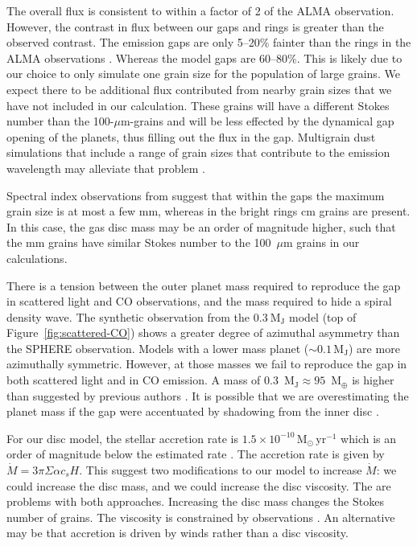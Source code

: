 \documentclass[usenatbib,a4paper,times]{mnras}
\renewcommand{\sun}{\mathrm{M}_{\odot}}
\renewcommand{\earth}{\mathrm{M}_{\oplus}}
\begin{document}
The overall flux is consistent to within a factor of 2 of the ALMA observation.
However, the contrast in flux between our gaps and rings is greater than the
observed contrast. The emission gaps are only 5--20$\%$ fainter than the rings
in the ALMA observations \citep{andrews:2016}. Whereas the model gaps are
60--80\%. This is likely due to our choice to only simulate one grain size for
the population of large grains. We expect there to be additional flux
contributed from nearby grain sizes that we have not included in our
calculation. These grains will have a different Stokes number than the
100-$\mu$m-grains and will be less effected by the dynamical gap opening of the
planets, thus filling out the flux in the gap. Multigrain dust simulations that
include a range of grain sizes that contribute to the emission wavelength may
alleviate that problem \citep{hutchison:2018}.

Spectral index observations from \citet{huang:2018} suggest that within the gaps
the maximum grain size is at most a few mm, whereas in the bright rings cm
grains are present. In this case, the gas disc mass may be an order of magnitude
higher, such that the mm grains have similar Stokes number to the 100~$\mu$m
grains in our calculations.

There is a tension between the outer planet mass required to reproduce the gap
in scattered light and CO observations, and the mass required to hide a spiral
density wave. The synthetic observation from the $0.3~\mathrm{M_J}$ model (top
of Figure~\ref{fig:scattered-CO}) shows a greater degree of azimuthal asymmetry
than the SPHERE observation. Models with a lower mass planet ($\sim
0.1\,\mathrm{M_J}$) are more azimuthally symmetric. However, at those masses we
fail to reproduce the gap in both scattered light and in CO emission. A mass of
0.3~$\mathrm{M_J} \approx 95$~$\earth{}$ is higher than suggested by previous
authors \citep{dong:2017b, van-boekel:2017}. It is possible that we are
overestimating the planet mass if the gap were accentuated by shadowing from the
inner disc \citep{debes:2013, debes:2017, poteet:2018}.

For our disc model, the stellar accretion rate is $1.5\times
10^{-10}\,\sun{}\,\mathrm{yr}^{-1}$ which is an order of magnitude below the
estimated rate \citep{brickhouse:2012}. The accretion rate is given by $\dot{M}
= 3\pi\Sigma\alpha c_s H$. This suggest two modifications to our model to
increase $\dot{M}$: we could increase the disc mass, and we could increase the
disc viscosity. The are problems with both approaches. Increasing the disc mass
changes the Stokes number of grains. The viscosity is constrained by
observations \citep{flaherty:2018}. An alternative may be that accretion is
driven by winds \citep{simon:2017a} rather than a disc viscosity.
\end{document}
